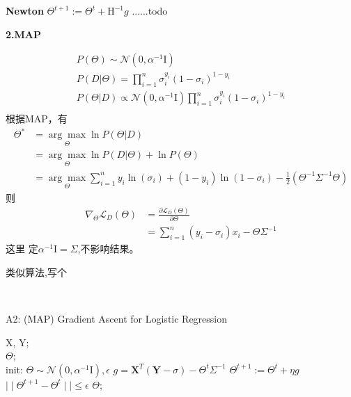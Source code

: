 \documentclass[UTF8]{ctexart}
\begin{document}
\textbf{Newton}
$\Theta^{t+1} := \Theta^t + \text{H}^{-1} g$
......todo

\textbf{2.MAP}

\begin{gather*}
    P(\Theta) \sim \mathcal{N}(0, \alpha^{-1}\text{I}) \\
    P(D|\Theta) = \prod_{i=1}^n\sigma_i^{y_i}(1-\sigma_i)^{1-y_i} \\
    P(\Theta | D) \propto \mathcal{N}(0, \alpha^{-1}\text{I}) \prod_{i=1}^n\sigma_i^{y_i}(1-\sigma_i)^{1-y_i} \\
\end{gather*}
根据MAP，有
\begin{equation*}
    \begin{aligned}
        \Theta^* &= \underset {\Theta} {\arg \max} \ln{P(\Theta|D)} \\
        &= \underset{\Theta}{\arg \max} \ln P(D|\Theta) + \ln P(\Theta) \\
        &= \underset{\Theta}{\arg \max} {\sum_{i=1}^n y_i \ln(\sigma_i) + (1-y_i)\ln{(1-\sigma_i)} -\frac{1}{2}(\Theta^{-1}\Sigma^{-1}\Theta)} 
    \end{aligned}        
\end{equation*}
则
\begin{equation*}
    \begin{aligned}
        \nabla_\Theta \mathcal{L}_D(\Theta) &=\frac{\partial \mathcal{L}_D ( \Theta) }{\partial \Theta} \\
        &= \sum_{i=1}^n(y_i-\sigma_i)x_i - \Theta \Sigma^{-1} 
    \end{aligned}
\end{equation*}
这里 定$\alpha^{-1}\mathrm{I} = \Sigma$,不影响结果。

类似算法,写个

\
\begin{algorithm}[htb]
    \caption{A2: (MAP) Gradient Ascent for Logistic Regression}
    \label{alg:A2}
    \begin{algorithmic}[1]
    \REQUIRE
    X, Y; \\
    \ENSURE 
    $\Theta$; \\
    \STATE init: $\Theta \sim \mathcal{N}(0, \alpha^{-1}\mathrm{I}), \epsilon$
    \REPEAT 
    \STATE $g=\mathbf{X}^T(\mathbf{Y}-\sigma) - \Theta^t\Sigma^{-1}$
    \STATE $\Theta^{t+1} := \Theta^t + \eta g$
    \UNTIL $\mid\mid \Theta^{t+1} -\Theta^t \mid\mid \leq \epsilon$
    \RETURN $\Theta$;
    \end{algorithmic}
\end{algorithm}
\end{document}
